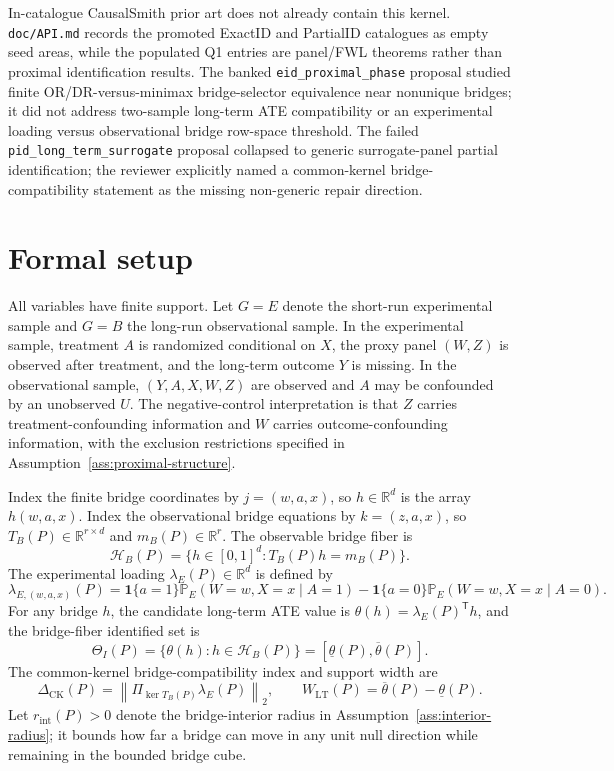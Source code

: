 \documentclass[11pt]{article}
\renewcommand{\Pr}{\mathbb{P}}
\newcommand{\one}{\mathbf{1}}
\newcommand{\transpose}{\mathsf{T}}
\newcommand{\calH}{\mathcal{H}}
\newcommand{\R}{\mathbb{R}}
\theoremstyle{definition}
\theoremstyle{plain}
\theoremstyle{remark}
\begin{document}
In-catalogue CausalSmith prior art does not already contain this kernel.
\texttt{doc/API.md} records the promoted ExactID and PartialID catalogues as
empty seed areas, while the populated Q1 entries are panel/FWL theorems rather
than proximal identification results.  The banked \texttt{eid\_proximal\_phase}
proposal studied finite OR/DR-versus-minimax bridge-selector equivalence near
nonunique bridges; it did not address two-sample long-term ATE compatibility or
an experimental loading versus observational bridge row-space threshold.  The
failed \texttt{pid\_long\_term\_surrogate} proposal collapsed to generic
surrogate-panel partial identification; the reviewer explicitly named a
common-kernel bridge-compatibility statement as the missing non-generic repair
direction.

\section{Formal setup}
All variables have finite support.  Let \(G=E\) denote the short-run
experimental sample and \(G=B\) the long-run observational sample.  In the
experimental sample, treatment \(A\) is randomized conditional on \(X\), the
proxy panel \((W,Z)\) is observed after treatment, and the long-term outcome
\(Y\) is missing.  In the observational sample, \((Y,A,X,W,Z)\) are observed
and \(A\) may be confounded by an unobserved \(U\).  The negative-control
interpretation is that \(Z\) carries treatment-confounding information and
\(W\) carries outcome-confounding information, with the exclusion restrictions
specified in Assumption~\ref{ass:proximal-structure}.

Index the finite bridge coordinates by \(j=(w,a,x)\), so \(h\in\R^d\) is the
array \(h(w,a,x)\).  Index the observational bridge equations by
\(k=(z,a,x)\), so \(T_B(P)\in\R^{r\times d}\) and \(m_B(P)\in\R^r\).  The
observable bridge fiber is
\[
\calH_B(P)=\{h\in[0,1]^d:T_B(P)h=m_B(P)\}.
\]
The experimental loading \(\lambda_E(P)\in\R^d\) is defined by
\[
\lambda_{E,(w,a,x)}(P)=
\one\{a=1\}\Pr_E(W=w,X=x\mid A=1)
-\one\{a=0\}\Pr_E(W=w,X=x\mid A=0).
\]
For any bridge \(h\), the candidate long-term ATE value is
\(\theta(h)=\lambda_E(P)^\transpose h\), and the bridge-fiber identified set
is
\[
\Theta_I(P)=\{\theta(h):h\in\calH_B(P)\}
=[\underline\theta(P),\overline\theta(P)].
\]
The common-kernel bridge-compatibility index and support width are
\[
\Delta_{\mathrm{CK}}(P)=
\left\|\Pi_{\ker T_B(P)}\lambda_E(P)\right\|_2,\qquad
W_{\mathrm{LT}}(P)=\overline\theta(P)-\underline\theta(P).
\]
Let \(r_{\mathrm{int}}(P)>0\) denote the bridge-interior radius in
Assumption~\ref{ass:interior-radius}; it bounds how far a bridge can move in
any unit null direction while remaining in the bounded bridge cube.
\end{document}
